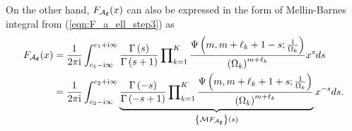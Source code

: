 \documentclass[12pt,onecolumn,draftcls]{IEEEtran}
\newcommand{\bs}{\boldsymbol}
\begin{document}
On the other hand, ${F_{{{ {\cal A}}_{\bs{\ell}}}}}(x)$ can also be expressed in the form of Mellin-Barnes integral from (\ref{eqn:F_a_ell_step3}) as
\begin{align}\label{eqn:F_A0_brane_inte}
{F_{{{ {\cal A}}_{\bs{\ell}}}}}(x) &= \frac{1}{{2\pi {\rm{i}}}}\int\nolimits_{c_1 - {\rm{i}}\infty }^{c_1 + {\rm{i}}\infty } {\frac{{\Gamma \left( s \right)}}{{\Gamma \left( {s + 1} \right)}}\prod\nolimits_{k = 1}^K {\frac{{\Psi \left( {m ,m + \ell_k + 1 - s;\frac{1}{{{\Omega _k}}}} \right)}}{{{{\left( {{\Omega _k}} \right)}^{m+\ell_k}}}}} {x^s}ds} \notag \\
&=\frac{1}{{2\pi {\rm{i}}}}\int_{{c_2} - {\rm{i}}\infty }^{{c_2} + {\rm{i}}\infty } {\underbrace {\frac{{\Gamma \left( { - s} \right)}}{{\Gamma \left( { - s + 1} \right)}}\prod\nolimits_{k = 1}^K {\frac{{\Psi \left( {m,m + {\ell _k} + 1 + s;\frac{1}{{{\Omega _k}}}} \right)}}{{{{\left( {{\Omega _k}} \right)}^{m + {\ell _k}}}}}} }_{\left\{ {\mathcal M{F_{{{\cal A}_{\bs \ell} }}}} \right\}\left( s \right)}{x^{ - s}}ds}.
\end{align}
\end{document}
